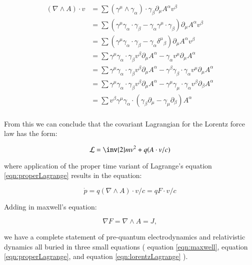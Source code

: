 \documentclass{article}
\newcommand{\grad}[0] {\nabla}
\newcommand{\pdot}[0]{\dot{p}}
\begin{document}
\begin{align*}
(\grad \wedge A) \cdot v
&= \sum ( \gamma^{\mu} \wedge \gamma_{\alpha} ) \cdot \gamma_{\beta} \partial_{\mu} A^{\alpha} v^{\beta} \\
&= \sum (\gamma^{\mu} \gamma_{\alpha} \cdot \gamma_{\beta} - \gamma_{\alpha} \gamma^{\mu} \cdot \gamma_{\beta}) \partial_{\mu} A^{\alpha} v^{\beta} \\
&= \sum (\gamma^{\mu} \gamma_{\alpha} \cdot \gamma_{\beta} - \gamma_{\alpha} {\delta^{\mu}}_{\beta}) \partial_{\mu} A^{\alpha} v^{\beta} \\
&= \sum 
 \gamma^{\mu} \gamma_{\alpha} \cdot \gamma_{\beta} v^{\beta} \partial_{\mu} A^{\alpha}
-\gamma_{\alpha} v^{\mu} \partial_{\mu} A^{\alpha} \\
&= \sum 
 \gamma^{\mu} \gamma_{\alpha} \cdot \gamma_{\beta} v^{\beta} \partial_{\mu} A^{\alpha}
-
\gamma^{\beta} \gamma_{\beta} \cdot \gamma_{\alpha}
 v^{\mu} \partial_{\mu} A^{\alpha} \\
&= \sum 
 \gamma^{\mu} \gamma_{\alpha} \cdot \gamma_{\beta} v^{\beta} \partial_{\mu} A^{\alpha}
-
\gamma^{\mu} \gamma_{\mu} \cdot \gamma_{\alpha} v^{\beta} \partial_{\beta} A^{\alpha} \\
&= \sum v^{\beta} \gamma^{\mu} \gamma_{\alpha} \cdot ( \gamma_{\beta} \partial_{\mu} - \gamma_{\mu} \partial_{\beta} ) A^{\alpha} \\ 
\end{align*}

From this we can conclude that the covariant Lagrangian for the Lorentz force law has the form:

\begin{equation}\label{eqn:lorentzLagrange}
\mathcal{L} = \inv{2}m v^2 + q (A \cdot v/c)
\end{equation}

where application of the proper time variant of Lagrange's equation \ref{eqn:properLagrange} results in the equation:

\begin{equation}
\pdot = q (\grad \wedge A) \cdot v/c = q F \cdot v/c
\end{equation}

Adding in maxwell's equation:

\begin{equation}\label{eqn:maxwell}
\grad F = \grad \wedge A = J,
\end{equation}

we have a complete statement of pre-quantum electrodynamics and relativistic dynamics all buried in three small equations (
equation \ref{eqn:maxwell}, equation \ref{eqn:properLagrange}, and equation \ref{eqn:lorentzLagrange} ).
\end{document}
